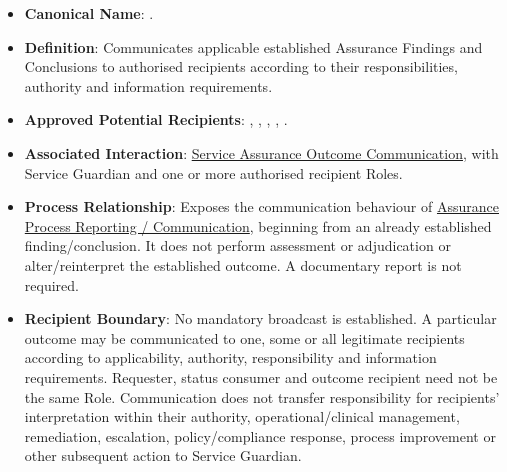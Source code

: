 \begin{itemize}

\item 
\textbf{Canonical Name}: \texttt{}.



\item 
\textbf{Definition}: Communicates applicable established Assurance Findings and Conclusions to authorised recipients according to their responsibilities, authority and information requirements.



\item 
\textbf{Approved Potential Recipients}: \texttt{}, \texttt{}, \texttt{}, \texttt{}, \texttt{}.



\item 
\textbf{Associated Interaction}: \href{https://github.com/fhirfactory/harmonia/blob/98410db60155198a75f74c79d98060070209faa1/docs/markdown/03-business-architecture/collaborations-interactions/interactions.md\#service-assurance-outcome-communication}{Service Assurance Outcome Communication}, with Service Guardian and one or more authorised recipient Roles.



\item 
\textbf{Process Relationship}: Exposes the communication behaviour of \href{https://github.com/fhirfactory/harmonia/blob/98410db60155198a75f74c79d98060070209faa1/docs/markdown/03-business-architecture/processes/business-processes.md\#assurance-process-reporting-communication}{Assurance Process Reporting /\allowbreak{} Communication}, beginning from an already established finding/\allowbreak{}conclusion. It does not perform assessment or adjudication or alter/\allowbreak{}reinterpret the established outcome. A documentary report is not required.



\item 
\textbf{Recipient Boundary}: No mandatory broadcast is established. A particular outcome may be communicated to one, some or all legitimate recipients according to applicability, authority, responsibility and information requirements. Requester, status consumer and outcome recipient need not be the same Role. Communication does not transfer responsibility for recipients' interpretation within their authority, operational/\allowbreak{}clinical management, remediation, escalation, policy/\allowbreak{}compliance response, process improvement or other subsequent action to Service Guardian.



\end{itemize}
\label{rad:assurance:198}
